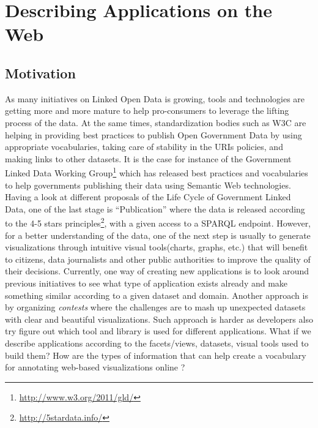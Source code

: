 
\section{Describing Applications on the Web}
 \label{sec:descApps}
 
 \subsection{Motivation}
As many initiatives on Linked Open Data is growing, tools and technologies are getting more and more mature to help pro-consumers to leverage the lifting process of the data. At the same times, standardization bodies such as W3C are helping in providing best practices to publish Open Government Data by using appropriate vocabularies, taking care of stability in the URIs policies, and making links to other datasets. It is the case for instance of the Government Linked Data Working Group\footnote{\url{http://www.w3.org/2011/gld/}} which has released best practices and vocabularies to help governments publishing their data using Semantic Web technologies. Having a look at different proposals of the Life Cycle of Government Linked Data, one of the last stage is ``Publication'' where the data is released according to the 4-5 stars principles\footnote{\url{http://5stardata.info/}}, with a given access to a SPARQL endpoint. However, for a better understanding of the data, one of the next step is usually to generate visualizations through intuitive visual tools(charts, graphs, etc.) that will benefit to citizens, data journalists and other public authorities to improve the quality of their decisions. Currently, one way of creating new applications is to look around previous initiatives to see what type of application exists already and make something similar according to a given dataset and domain. Another approach is by organizing \textit{contests} where the challenges are to mash up unexpected datasets with clear and beautiful visualizations. Such approach is harder as developers also try figure out which tool and library is used for different applications. What if we describe applications according to the facets/views, datasets, visual tools used to build them? How are the types of information that can help create a vocabulary for annotating web-based visualizations online ? 

